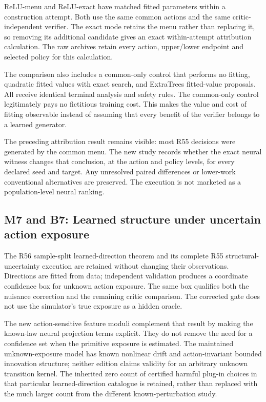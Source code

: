 \documentclass[ecta,nameyear,draft]{econsocart}
\begin{document}
ReLU-menu and ReLU-exact have matched fitted parameters within a
construction attempt. Both use the same common actions and the same
critic-independent verifier. The exact mode retains the menu rather than
replacing it, so removing its additional candidate gives an exact
within-attempt attribution calculation. The raw archives retain every
action, upper/lower endpoint and selected policy for this calculation.

The comparison also includes a common-only control that performs no
fitting, quadratic fitted values with exact search, and ExtraTrees
fitted-value proposals. All receive identical terminal analysis and
safety rules. The common-only control legitimately pays no fictitious
training cost. This makes the value and cost of fitting observable
instead of assuming that every benefit of the verifier belongs to a
learned generator.

The preceding attribution result remains visible: most R55 decisions
were generated by the common menu. The new study records whether the
exact neural witness changes that conclusion, at the action and policy
levels, for every declared seed and target. Any unresolved paired
differences or lower-work conventional alternatives are preserved. The
execution is not marketed as a population-level neural ranking.

\hypertarget{m7-and-b7-learned-structure-under-uncertain-action-exposure}{%
\subsection{M7 and B7: Learned structure under uncertain action
exposure}\label{m7-and-b7-learned-structure-under-uncertain-action-exposure}}

The R56 sample-split learned-direction theorem and its complete R55
structural-uncertainty execution are retained without changing their
observations. Directions are fitted from data; independent validation
produces a coordinate confidence box for unknown action exposure. The
same box qualifies both the nuisance correction and the remaining critic
comparison. The corrected gate does not use the simulator's true
exposure as a hidden oracle.

The new action-sensitive feature moduli complement that result by making
the known-law neural projection terms explicit. They do not remove the
need for a confidence set when the primitive exposure is estimated. The
maintained unknown-exposure model has known nonlinear drift and
action-invariant bounded innovation structure; neither edition claims
validity for an arbitrary unknown transition kernel. The inherited zero
count of certified harmful plug-in choices in that particular
learned-direction catalogue is retained, rather than replaced with the
much larger count from the different known-perturbation study.
\end{document}
